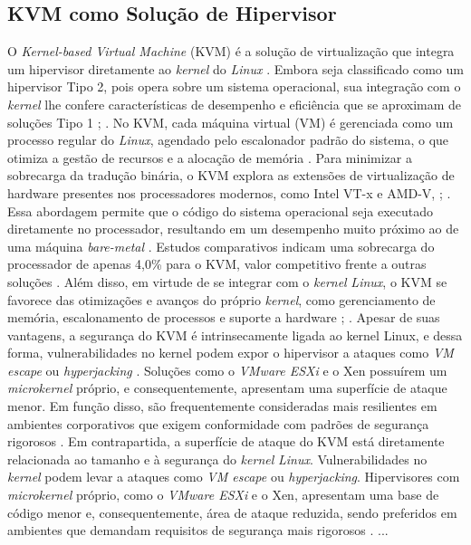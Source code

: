 \subsection{KVM como Solução de Hipervisor}

O \textit{Kernel-based Virtual Machine} (KVM) é a solução de virtualização que integra um hipervisor diretamente ao \textit{kernel} do \textit{Linux} \cite{carissimi2008}. Embora seja classificado como um hipervisor Tipo 2, pois opera sobre um sistema operacional, sua integração com o \textit{kernel} lhe confere características de desempenho e eficiência que se aproximam de soluções Tipo 1 \cite{chawla2025}; \cite{kominos2017}. No KVM, cada máquina virtual (VM) é gerenciada como um processo regular do \textit{Linux}, agendado pelo escalonador padrão do sistema, o que otimiza a gestão de recursos e a alocação de memória \cite{anand2013}.
Para minimizar a sobrecarga da tradução binária, o KVM explora as extensões de virtualização de hardware presentes nos processadores modernos, como Intel VT-x e AMD-V, \cite{chawla2025}; \cite{carissimi2008}. Essa abordagem permite que o código do sistema operacional seja executado diretamente no processador, resultando em um desempenho muito próximo ao de uma máquina \textit{bare-metal} \cite{kominos2017}. Estudos comparativos indicam uma sobrecarga do processador de apenas 4,0\% para o KVM, valor competitivo frente a outras soluções \cite{chawla2025}. Além disso, em virtude de se integrar com o \textit{kernel} \textit{Linux}, o KVM se favorece das otimizações e avanços do próprio \textit{kernel}, como gerenciamento de memória, escalonamento de processos e suporte a hardware \cite{anand2013}; \cite{arora2014}.
Apesar de suas vantagens, a segurança do KVM é intrinsecamente ligada ao kernel Linux, e dessa forma, vulnerabilidades no kernel podem expor o hipervisor a ataques como \textit{VM escape} ou \textit{hyperjacking} \cite{chawla2025}. Soluções como o \textit{VMware ESXi} e o Xen possuírem um \textit{microkernel} próprio, e consequentemente, apresentam uma superfície de ataque menor. Em função disso, são frequentemente consideradas mais resilientes em ambientes corporativos que exigem conformidade com padrões de segurança rigorosos \cite{chawla2025}.
Em contrapartida, a superfície de ataque do KVM está diretamente relacionada ao tamanho e à segurança do \textit{kernel} \textit{Linux}. Vulnerabilidades no \textit{kernel} podem levar a ataques como \textit{VM escape} ou \textit{hyperjacking}. Hipervisores com \textit{microkernel} próprio, como o \textit{VMware ESXi} e o Xen, apresentam uma base de código menor e, consequentemente, área de ataque reduzida, sendo preferidos em ambientes que demandam requisitos de segurança mais rigorosos \cite{chawla2025}.
{{ ... }}
